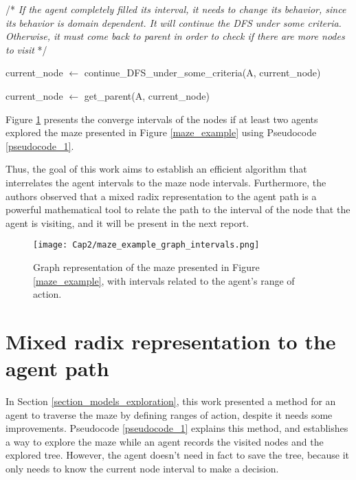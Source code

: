 \begin{algorithm}
\begin{algorithmic}
\EndIf

\State

\State /* \textit{If the agent completely filled its interval, it needs to change its behavior, since its}
\State \textit{behavior is domain dependent. It will continue the DFS under some criteria.}
\State \textit{Otherwise, it must come back to parent in order to check if there are more nodes to}
\State \textit{visit} */


\State current\_node $\gets$ continue\_DFS\_under\_some\_criteria(A, current\_node)

\Else

\State current\_node $\gets$ get\_parent(A, current\_node)

\EndIf

\EndWhile

\end{algorithmic}
\end{algorithm}


Figure \ref{maze_example_graph_intervals} presents the converge intervals of the nodes if at least two agents explored the maze presented in Figure \ref{maze_example} using Pseudocode \ref{pseudocode_1}.

Thus, the goal of this work aims to establish an efficient algorithm that interrelates the agent intervals to the maze node intervals. Furthermore, the authors observed that a mixed radix representation to the agent path is a powerful mathematical tool to relate the path to the interval of the node that the agent is visiting, and it will be present in the next report.

\begin{figure}[ht!]
\centering
\texttt{[image: Cap2/maze\_example\_graph\_intervals.png]}
\caption{Graph representation of the maze presented in Figure \ref{maze_example}, with intervals related to the agent's range of action.}
\label{maze_example_graph_intervals}
\end{figure}	

\section{Mixed radix representation to the agent path}
\label{section_models_mixed_radix}
In Section \ref{section_models_exploration}, this work presented a method for an agent to traverse the maze by defining ranges of action, despite it needs some improvements. Pseudocode \ref{pseudocode_1} explains this method, and establishes a way to explore the maze while an agent records the visited nodes and the explored tree. However, the agent doesn't need in fact to save the tree, because it only needs to know the current node interval to make a decision.

